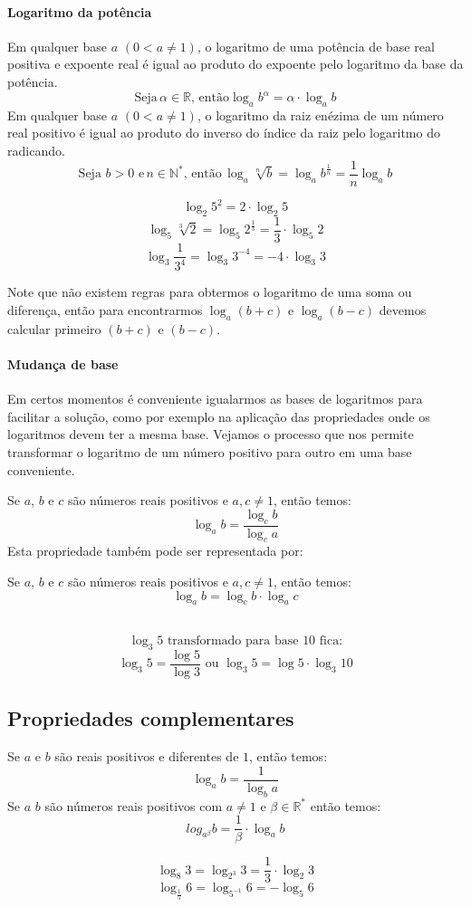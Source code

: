 \paragraph{Logaritmo da potência}
Em qualquer base $a$ $(0 < a \neq 1)$, o logaritmo de uma potência de base real positiva e expoente real é igual ao produto do expoente pelo logaritmo da base da potência.
\[\textrm{Seja}\, \alpha \in \mathbb{R},\, \textrm{então} \log_a b^{\alpha} = \alpha \cdot \log_a b \]
Em qualquer base $a$ $(0 < a \neq 1)$, o logaritmo da raiz enézima de um número real positivo é igual ao produto do inverso do índice da raiz pelo logaritmo do radicando.
\[\textrm{Seja}\,\, b > 0 \,\,\textrm{e} \,n \in \mathbb{N}^{*}, \,\textrm{então}\, \log_a \sqrt[n]{b} = \log_a b^{\frac{1}{n}} = \frac{1}{n}\log_a b \]
\begin{exemplo}
\[\log_2 5^2 = 2\cdot\log_2 5\]
\[\log_5 \sqrt[3]{2} = \log_5 2^{\frac{1}{3}} = \frac{1}{3}\cdot \log_5 2\]
\[\log_3 \frac{1}{3^4} = \log_3 3^{-4} = -4 \cdot \log_3 3\]
\end{exemplo}
Note que não existem regras para obtermos o logaritmo de uma soma ou diferença, então para encontrarmos $\log_a (b + c)$ e $\log_a (b - c)$ devemos calcular primeiro $(b + c)$ e $(b - c)$.
\paragraph{Mudança de base}
Em certos momentos é conveniente igualarmos as bases de logaritmos para facilitar a solução, como por exemplo na aplicação das propriedades onde os logaritmos devem ter a mesma base. Vejamos o processo que nos permite transformar o logaritmo de um número positivo para outro em uma base conveniente. \par 
Se $a$, $b$ e $c$ são números reais positivos e $a$,\,$c \neq 1$, então temos:
\[\log_a b = \frac{\log_c b}{\log_c a}\]
Esta propriedade também pode ser representada por: \par 
Se $a$, $b$ e $c$ são números reais positivos e $a$,\,$c \neq 1$, então temos:
\[\log_a b = \log_c b \cdot \log_a c\]\\
\begin{exemplo}
\[\log_3 5 \,\, \textrm{transformado para base}\,\, 10 \,\,\textrm{fica:} \]
\[\log_3 5 = \frac{\log 5}{\log 3} \,\,\textrm{ou}\,\, \log_3 5 = \log 5 \cdot \log_3 10 \]
\end{exemplo}

\subsection{Propriedades complementares}
Se $a$ e $b$ são reais positivos e diferentes de $1$, então temos:
\[\log_a b = \frac{1}{\log_b a}\]
Se $a$ $b$ são números reais positivos com $a \neq 1$ e $\beta \in \mathbb{R}^{*}$ então temos:
\[log_{a^{\beta}} b = \frac{1}{\beta}\cdot\log_a b\]
\begin{exemplo}
\[\log_8 3 = \log_{2^{3}} 3 = \frac{1}{3}\cdot \log_2 3\]
\[\log_{\frac{1}{5}} 6 = \log_{5^{-1}} 6 = -\log_5 6\]
\end{exemplo}
